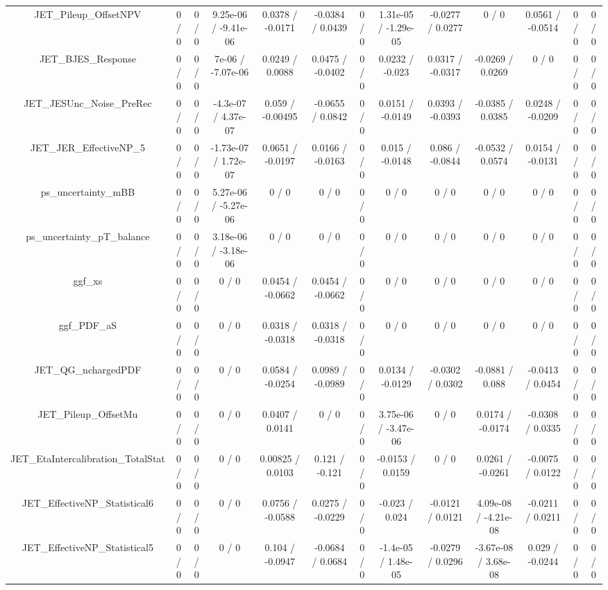 \documentclass[10pt]{article}
\begin{document}
\begin{table}[htbp]
\begin{center}
\begin{tabular}{|c|c|c|c|c|c|c|c|c|c|c|c|c|}
  JET_Pileup_OffsetNPV & 0 / 0 & 0 / 0 & 9.25e-06 / -9.41e-06 & 0.0378 / -0.0171 & -0.0384 / 0.0439 & 0 / 0 & 1.31e-05 / -1.29e-05 & -0.0277 / 0.0277 & 0 / 0 & 0.0561 / -0.0514 & 0 / 0 & 0 / 0 \\ 
  JET_BJES_Response & 0 / 0 & 0 / 0 & 7e-06 / -7.07e-06 & 0.0249 / 0.0088 & 0.0475 / -0.0402 & 0 / 0 & 0.0232 / -0.023 & 0.0317 / -0.0317 & -0.0269 / 0.0269 & 0 / 0 & 0 / 0 & 0 / 0 \\ 
  JET_JESUnc_Noise_PreRec & 0 / 0 & 0 / 0 & -4.3e-07 / 4.37e-07 & 0.059 / -0.00495 & -0.0655 / 0.0842 & 0 / 0 & 0.0151 / -0.0149 & 0.0393 / -0.0393 & -0.0385 / 0.0385 & 0.0248 / -0.0209 & 0 / 0 & 0 / 0 \\ 
  JET_JER_EffectiveNP_5 & 0 / 0 & 0 / 0 & -1.73e-07 / 1.72e-07 & 0.0651 / -0.0197 & 0.0166 / -0.0163 & 0 / 0 & 0.015 / -0.0148 & 0.086 / -0.0844 & -0.0532 / 0.0574 & 0.0154 / -0.0131 & 0 / 0 & 0 / 0 \\ 
  ps_uncertainty_mBB & 0 / 0 & 0 / 0 & 5.27e-06 / -5.27e-06 & 0 / 0 & 0 / 0 & 0 / 0 & 0 / 0 & 0 / 0 & 0 / 0 & 0 / 0 & 0 / 0 & 0 / 0 \\ 
  ps_uncertainty_pT_balance & 0 / 0 & 0 / 0 & 3.18e-06 / -3.18e-06 & 0 / 0 & 0 / 0 & 0 / 0 & 0 / 0 & 0 / 0 & 0 / 0 & 0 / 0 & 0 / 0 & 0 / 0 \\ 
  ggf_xs & 0 / 0 & 0 / 0 & 0 / 0 & 0.0454 / -0.0662 & 0.0454 / -0.0662 & 0 / 0 & 0 / 0 & 0 / 0 & 0 / 0 & 0 / 0 & 0 / 0 & 0 / 0 \\ 
  ggf_PDF_aS & 0 / 0 & 0 / 0 & 0 / 0 & 0.0318 / -0.0318 & 0.0318 / -0.0318 & 0 / 0 & 0 / 0 & 0 / 0 & 0 / 0 & 0 / 0 & 0 / 0 & 0 / 0 \\ 
  JET_QG_nchargedPDF & 0 / 0 & 0 / 0 & 0 / 0 & 0.0584 / -0.0254 & 0.0989 / -0.0989 & 0 / 0 & 0.0134 / -0.0129 & -0.0302 / 0.0302 & -0.0881 / 0.088 & -0.0413 / 0.0454 & 0 / 0 & 0 / 0 \\ 
  JET_Pileup_OffsetMu & 0 / 0 & 0 / 0 & 0 / 0 & 0.0407 / 0.0141 & 0 / 0 & 0 / 0 & 3.75e-06 / -3.47e-06 & 0 / 0 & 0.0174 / -0.0174 & -0.0308 / 0.0335 & 0 / 0 & 0 / 0 \\ 
  JET_EtaIntercalibration_TotalStat & 0 / 0 & 0 / 0 & 0 / 0 & 0.00825 / 0.0103 & 0.121 / -0.121 & 0 / 0 & -0.0153 / 0.0159 & 0 / 0 & 0.0261 / -0.0261 & -0.0075 / 0.0122 & 0 / 0 & 0 / 0 \\ 
  JET_EffectiveNP_Statistical6 & 0 / 0 & 0 / 0 & 0 / 0 & 0.0756 / -0.0588 & 0.0275 / -0.0229 & 0 / 0 & -0.023 / 0.024 & -0.0121 / 0.0121 & 4.09e-08 / -4.21e-08 & -0.0211 / 0.0211 & 0 / 0 & 0 / 0 \\ 
  JET_EffectiveNP_Statistical5 & 0 / 0 & 0 / 0 & 0 / 0 & 0.104 / -0.0947 & -0.0684 / 0.0684 & 0 / 0 & -1.4e-05 / 1.48e-05 & -0.0279 / 0.0296 & -3.67e-08 / 3.68e-08 & 0.029 / -0.0244 & 0 / 0 & 0 / 0 \\ 

\end{tabular}
\end{center}
\end{table}
\end{document}
